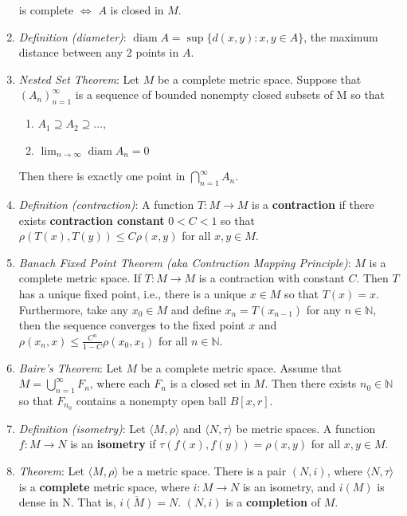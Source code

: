 \documentclass[10pt]{article}
\DeclareMathOperator{\diam}{diam}
\begin{document}
\begin{multicols*}{3}
\begin{enumerate}
		      is complete \(\iff\) \(A\) is closed in \(M\).
		\item \emph{Definition (diameter)}: \(\diam A = \sup\{d(x,y):x,y\in A\}\), the maximum
		      distance between any 2 points in \(A\).
		\item \emph{Nested Set Theorem}: Let \(M\) be a complete metric space. Suppose that
		      \((A_n)^\infty_{n=1}\) is a sequence of bounded nonempty closed subsets of M
		      so that
		      \begin{enumerate}
			      \item \(A_1 \supseteq A_2 \supseteq \dots\),
			      \item \(\lim_{n\to\infty} \diam A_n = 0\)
		      \end{enumerate}
		      Then there is exactly one point in \(\bigcap^\infty_{n=1}A_n\).
		\item \emph{Definition (contraction)}: A function \(T:M\to M\) is a
		      \textbf{contraction} if there exists \textbf{contraction constant} \(0<C<1\) so that
		      \(\rho(T(x),T(y))\leq C\rho(x,y)\) for all \(x,y\in M\).
		\item \emph{Banach Fixed Point Theorem (aka Contraction Mapping Principle)}: \(M\) is a
		      complete metric space. If \(T:M\to M\) is a contraction with
		      constant \(C\). Then \(T\) has a unique fixed point, i.e., there is a unique
		      \(x\in M\) so that \(T(x)=x\). Furthermore, take any \(x_0 \in M\) and define
		      \(x_n = T(x_{n-1})\) for any \(n\in\mathbb{N}\), then the sequence converges
		      to the fixed point \(x\) and \(\rho(x_n,x)\leq\frac{C^n}{1-C}\rho(x_0,x_1)\)
		      for all \(n\in\mathbb{N}\).
		\item \emph{Baire's Theorem}: Let \(M\) be a complete metric space. Assume that
		      \(M=\bigcup^\infty_{n=1} F_n\), where each \(F_n\) is a closed set in \(M\).
		      Then there exists \(n_0 \in \mathbb{N}\) so that \(F_{n_0}\) contains a nonempty
		      open ball \(B[x,r]\).
		\item \emph{Definition (isometry)}: Let \(\langle M,\rho\rangle\) and \(\langle N,\tau\rangle\)
		      be metric spaces. A function \(f:M\to N\) is an \textbf{isometry} if
		      \(\tau(f(x),f(y)) = \rho(x,y)\) for all \(x,y\in M\).
		\item \emph{Theorem}: Let \(\langle M,\rho\rangle\) be a metric space. There is a pair
		      \((N,i)\), where \(\langle N,\tau\rangle\) is a \textbf{complete} metric space,
		      where \(i:M\to N\) is an isometry, and \(i(M)\) is dense in N. That
		      is, \(\overline{i(M)} = N\). \((N,i)\) is a \textbf{completion} of \(M\).

\end{enumerate}
\end{multicols*}
\end{document}
